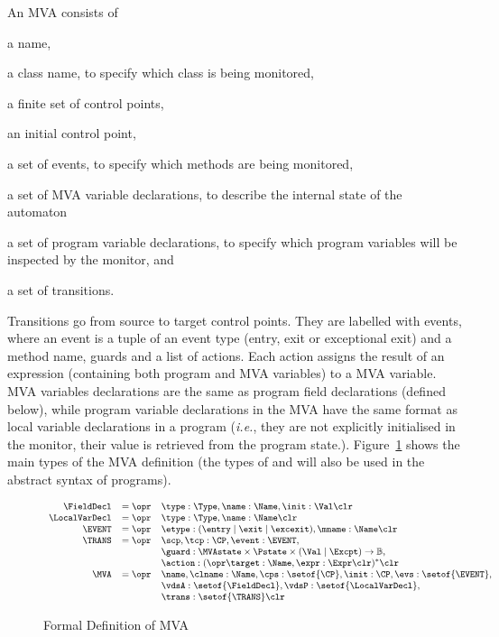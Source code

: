 An MVA consists of
\begin{inparaenum}
\item a name,
\item a class name, to specify which class is being monitored,
\item a finite set of control points,
\item an initial control point,
\item a set of events, to specify which methods are being monitored,
\item a set of MVA variable declarations, to describe 
the internal state of the automaton
\item a set of program variable declarations, to specify which
program variables will be inspected by the monitor, and
\item a set of transitions.
\end{inparaenum}
Transitions go from source to target control points. They are labelled
with events, where an event is a tuple of an event type (entry, exit
or exceptional exit) and a method name, guards and a list of
actions. Each action assigns the result of an expression (containing
both program and MVA variables) to a MVA variable. MVA variables
declarations are the same as program field declarations (defined
below), while program variable declarations in the MVA have the same
format as local variable declarations in a program (\emph{i.e.}, they
are not explicitly initialised in the monitor, their value is retrieved from
the program state.). Figure~\ref{FigMVAForm} shows the
main types of the MVA definition (the types of \FieldDecl and
\LocalVarDecl will also be used in the abstract syntax of programs).

\begin{figure}[t]
\[{\small
\begin{array}{rcl}
\FieldDecl & = \opr & \type : \Type, \name : \Name, \init : \Val
\clr \\
\LocalVarDecl & = \opr & \type : \Type, \name : \Name \clr \\
\EVENT & = \opr & \etype : (\entry \mid \exit \mid \excexit),
                 \mname : \Name \clr\\
\TRANS & = \opr & \scp, \tcp : \CP, \event : \EVENT, \\
& &
\guard : \MVAstate \times \Pstate \times (\Val \mid \Excpt) \rightarrow \mathbb{B}, \\
&& \action : (\opr \target : \Name, \expr : \Expr \clr)^* \clr\\
\MVA & = \opr & \name, \clname : \Name, \cps : \setof{\CP},
            \init : \CP, \evs : \setof{\EVENT},\\
     &   &  \vdsA : \setof{\FieldDecl}, \vdsP : \setof{\LocalVarDecl},\\
     &   &  \trans : \setof{\TRANS} \clr
\end{array}}
\]
\caption{Formal Definition of MVA}\label{FigMVAForm}
\end{figure}


